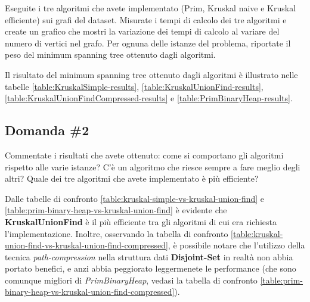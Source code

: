 \begin{displayquote}
Eseguite i tre algoritmi che avete implementato (Prim, Kruskal naive e Kruskal efficiente) sui grafi del dataset. Misurate i tempi di calcolo dei tre algoritmi e create un grafico che mostri la variazione dei tempi di calcolo al variare del numero di vertici nel grafo. Per ognuna delle istanze del problema, riportate il peso del minimum spanning tree ottenuto dagli algoritmi.
\end{displayquote}

\noindent Il risultato del minimum spanning tree ottenuto dagli algoritmi è illustrato nelle tabelle \ref{table:KruskalSimple-results}, \ref{table:KruskalUnionFind-results}, \ref{table:KruskalUnionFindCompressed-results} e \ref{table:PrimBinaryHeap-results}.


\subsection{Domanda \#2}

\begin{displayquote}
Commentate i risultati che avete ottenuto: come si comportano gli algoritmi rispetto alle varie istanze? C'è un algoritmo che riesce sempre a fare meglio degli altri? Quale dei tre algoritmi che avete implementato è più efficiente?
\end{displayquote}



\noindent Dalle tabelle di confronto \ref{table:kruskal-simple-vs-kruskal-union-find} e \ref{table:prim-binary-heap-vs-kruskal-union-find} è evidente che \textbf{KruskalUnionFind} è il più efficiente tra gli algoritmi di cui era richiesta l'implementazione. Inoltre, osservando la tabella di confronto \ref{table:kruskal-union-find-vs-kruskal-union-find-compressed}, è possibile notare che l'utilizzo della tecnica \textit{path-compression} nella struttura dati \textbf{Disjoint-Set} in realtà non abbia portato benefici, e anzi abbia peggiorato leggermenete le performance (che sono comunque migliori di \textit{PrimBinaryHeap}, vedasi la tabella di confronto \ref{table:prim-binary-heap-vs-kruskal-union-find-compressed}). \\

